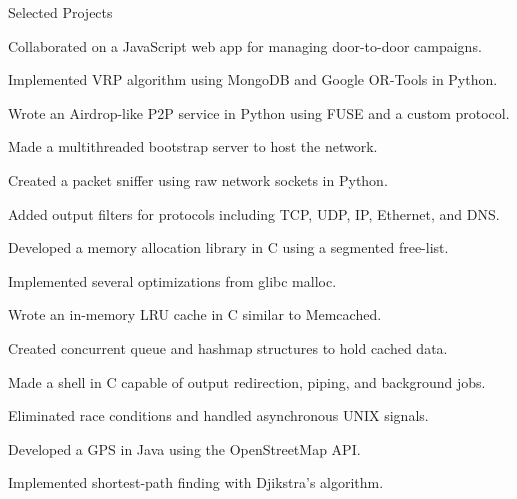 \documentclass{cv}
\begin{document}
\begin{cvsection}{Selected Projects}
  {
    \item Collaborated on a JavaScript web app for managing door-to-door campaigns.
    \item Implemented VRP algorithm using MongoDB and Google OR-Tools in Python.
  }
  {
    \item Wrote an Airdrop-like P2P service in Python using FUSE and a custom protocol.
    \item Made a multithreaded bootstrap server to host the network.
  }
  {
    \item Created a packet sniffer using raw network sockets in Python.
    \item Added output filters for protocols including TCP, UDP, IP, Ethernet, and DNS.
  }
  {
    \item Developed a memory allocation library in C using a segmented free-list.
    \item Implemented several optimizations from glibc malloc.
  }
  {
    \item Wrote an in-memory LRU cache in C similar to Memcached.
    \item Created concurrent queue and hashmap structures to hold cached data.
  }
  {
    \item Made a shell in C capable of output redirection, piping, and background jobs. 
    \item Eliminated race conditions and handled asynchronous UNIX signals.
  }
  {
    \item Developed a GPS in Java using the OpenStreetMap API.
    \item Implemented shortest-path finding with Djikstra's algorithm.
  }
\end{cvsection}
\end{document}
